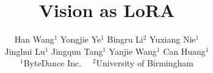 \documentclass[10pt,twocolumn,letterpaper]{article}
\title{Vision as LoRA}
\author{%
  Han Wang$^{1}$ \hspace{1.5cm} %
  Yongjie Ye$^{1}$ \hspace{1.5cm}
  Bingru Li$^{2}$ \hspace{1.5cm}
  Yuxiang Nie$^{1}$ \\ 
  Jinghui Lu$^{1}$ \hspace{1.2cm}
  Jingqun Tang$^{1}$ \hspace{1.2cm}
  Yanjie Wang$^{1}$ \hspace{1.2cm}
  Can Huang$^{1}$ 
  \\
  $^1$ByteDance Inc. \   \ $^2$University of Birmingham
}
\begin{document}
\maketitle
    






{
    \small
    
    
}
\end{document}
